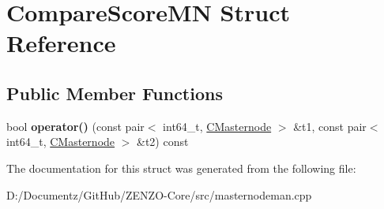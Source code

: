 \hypertarget{struct_compare_score_m_n}{}\section{Compare\+Score\+MN Struct Reference}
\label{struct_compare_score_m_n}
\subsection*{Public Member Functions}
\begin{DoxyCompactItemize}
\item 
\mbox{\label{struct_compare_score_m_n_a889b0ab67f4f82eed053e58cebb9dae2}} 
bool {\bfseries operator()} (const pair$<$ int64\+\_\+t, \mbox{\hyperlink{class_c_masternode}{C\+Masternode}} $>$ \&t1, const pair$<$ int64\+\_\+t, \mbox{\hyperlink{class_c_masternode}{C\+Masternode}} $>$ \&t2) const
\end{DoxyCompactItemize}


The documentation for this struct was generated from the following file\+:\begin{DoxyCompactItemize}
\item 
D\+:/\+Documentz/\+Git\+Hub/\+Z\+E\+N\+Z\+O-\/\+Core/src/masternodeman.\+cpp\end{DoxyCompactItemize}
